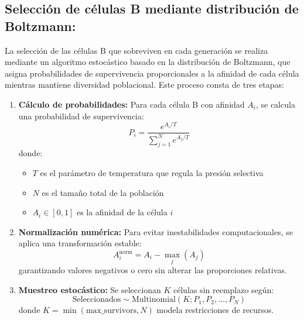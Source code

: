     \subsection*{Selección de células B mediante distribución de Boltzmann:}

La selección de las células B que sobreviven en cada generación se realiza mediante un algoritmo estocástico basado en la distribución de Boltzmann, que asigna probabilidades de supervivencia proporcionales a la afinidad de cada célula mientras mantiene diversidad poblacional. Este proceso consta de tres etapas:

\begin{enumerate}
    \item \textbf{Cálculo de probabilidades:} Para cada célula B con afinidad $A_i$, se calcula una probabilidad de supervivencia:
    \[
    P_i = \frac{e^{A_i / T}}{\sum_{j=1}^{N} e^{A_j / T}}
    \]
    donde:
    \begin{itemize}
        \item $T$ es el parámetro de temperatura que regula la presión selectiva
        \item $N$ es el tamaño total de la población
        \item $A_i \in [0,1]$ es la afinidad de la célula $i$
    \end{itemize}
    
    \item \textbf{Normalización numérica:} Para evitar inestabilidades computacionales, se aplica una transformación estable:
    \[
    A_i^{\text{norm}} = A_i - \max_{j}(A_j)
    \]
    garantizando valores negativos o cero sin alterar las proporciones relativas.
    
    \item \textbf{Muestreo estocástico:} Se seleccionan $K$ células sin reemplazo según:
    \[
    \text{Seleccionados} \sim \text{Multinomial}(K; P_1, P_2, \dots, P_N)
    \]
    donde $K = \min(\text{max\_survivors}, N)$ modela restricciones de recursos.
\end{enumerate}

